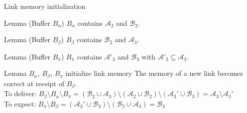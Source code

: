 \documentclass[10pt, xcolor={usenames, dvipsnames}]{beamer}
\begin{document}
\begin{frame}{Link memory initialization}

  \begin{center}
    
  \end{center}

  \vspace{-1em}

  \begin{minipage}{0.325\textwidth}
    \begin{block}{Lemma (Buffer $B_\alpha$)}
      $B_\alpha$ contains $\mathcal{A}_2$ and $\mathcal{B}_2$.
    \end{block}
  \end{minipage}
  \begin{minipage}{0.325\textwidth}
    \begin{block}{Lemma (Buffer $B_\beta$)}
      $B_\beta$ contains $\mathcal{B}_2$ and $\mathcal{A}_3$.
    \end{block}
  \end{minipage}
  \begin{minipage}{0.325\textwidth}
    \begin{block}{Lemma (Buffer $B_\pi$)}
      $B_\pi$ contains $\mathcal{A'}_3$ and $\mathcal{B}_3$ with 
      $\mathcal{A}'_3 \subseteq \mathcal{A}_3$.
    \end{block}
  \end{minipage}
  
  \begin{block}{Lemma $B_\alpha$, $B_\beta$, $B_\pi$ initialize link memory}
    The memory of a new link becomes correct at receipt of $B_\beta$. \\
    To deliver:
    $B_\beta \setminus B_\alpha \setminus B_\pi = (\mathcal{B}_2 \cup
    \mathcal{A}_3) \setminus (\mathcal{A}_2 \cup \mathcal{B}_2) \setminus
    (\mathcal{A}_3' \cup \mathcal{B}_3) = \mathcal{A}_3 \setminus
    \mathcal{A}_3'$\\
    To expect:
    $B_\pi \setminus B_\beta = (\mathcal{A}_3' \cup \mathcal{B}_3) \setminus
    (\mathcal{B}_2 \cup \mathcal{A}_3) = \mathcal{B}_3$

  \end{block}   
    
\end{frame}
\end{document}
